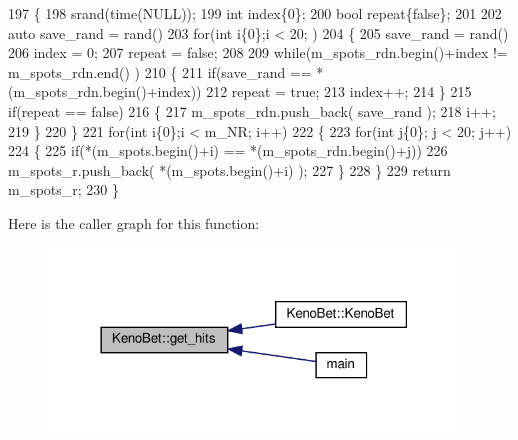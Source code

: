 \begin{DoxyCode}
197 \{
198     srand(time(NULL));
199     \textcolor{keywordtype}{int} index\{0\};
200     \textcolor{keywordtype}{bool} repeat\{\textcolor{keyword}{false}\};
201 
202     \textcolor{keyword}{auto} save\_rand = rand() %
203     \textcolor{keywordflow}{for}(\textcolor{keywordtype}{int} i\{0\};i < 20; )
204     \{
205         save\_rand = rand() %
206         index = 0;
207         repeat = \textcolor{keyword}{false};
208 
209         \textcolor{keywordflow}{while}(m\_spots\_rdn.begin()+index != m\_spots\_rdn.end() )
210         \{
211             \textcolor{keywordflow}{if}(save\_rand == *(m\_spots\_rdn.begin()+index))
212                 repeat = \textcolor{keyword}{true};
213             index++;
214         \}
215         \textcolor{keywordflow}{if}(repeat == \textcolor{keyword}{false})
216         \{
217             m\_spots\_rdn.push\_back( save\_rand );
218             i++;
219         \}
220     \}
221     \textcolor{keywordflow}{for}(\textcolor{keywordtype}{int} i\{0\};i < m\_NR; i++)
222     \{
223         \textcolor{keywordflow}{for}(\textcolor{keywordtype}{int} j\{0\}; j < 20; j++)
224         \{
225             \textcolor{keywordflow}{if}(*(m\_spots.begin()+i) == *(m\_spots\_rdn.begin()+j))
226                 m\_spots\_r.push\_back( *(m\_spots.begin()+i) );
227         \}
228     \}
229     \textcolor{keywordflow}{return} m\_spots\_r;
230 \}
\end{DoxyCode}
Here is the caller graph for this function\+:
\nopagebreak
\begin{figure}[H]
\begin{center}
\leavevmode
\includegraphics[width=309pt]{classKenoBet_a612b57c35203a41682269cdfbb31c2b1_icgraph}
\end{center}
\end{figure}
\mbox{\label{classKenoBet_aace00d82c42c9870a4f3b95c7ec79f24}} 
